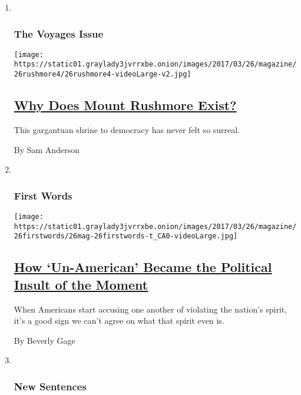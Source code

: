 \begin{enumerate}
\def\labelenumi{\arabic{enumi}.}
\item ~
  \hypertarget{the-voyages-issue-6}{%
  \subsubsection{The Voyages Issue}\label{the-voyages-issue-6}}

  \texttt{[image: https://static01.graylady3jvrrxbe.onion/images/2017/03/26/magazine/26rushmore4/26rushmore4-videoLarge-v2.jpg]}

  \hypertarget{why-does-mount-rushmore-exist}{%
  \subsection{\texorpdfstring{\href{/2017/03/22/magazine/why-does-mount-rushmore-exist.html}{Why
  Does Mount Rushmore
  Exist?}}{Why Does Mount Rushmore Exist?}}\label{why-does-mount-rushmore-exist}}

  This gargantuan shrine to democracy has never felt so surreal.

  By Sam Anderson
\item ~
  \hypertarget{first-words}{%
  \subsubsection{First Words}\label{first-words}}

  \texttt{[image: https://static01.graylady3jvrrxbe.onion/images/2017/03/26/magazine/26firstwords/26mag-26firstwords-t\_CA0-videoLarge.jpg]}

  \hypertarget{how-un-american-became-the-political-insult-of-the-moment}{%
  \subsection{\texorpdfstring{\href{/2017/03/21/magazine/how-un-american-became-the-political-insult-of-the-moment.html}{How
  `Un-American' Became the Political Insult of the
  Moment}}{How `Un-American' Became the Political Insult of the Moment}}\label{how-un-american-became-the-political-insult-of-the-moment}}

  When Americans start accusing one another of violating the nation's
  spirit, it's a good sign we can't agree on what that spirit even is.

  By Beverly Gage
\item ~
  \hypertarget{new-sentences}{%
  \subsubsection{New Sentences}\label{new-sentences}}


\end{enumerate}
